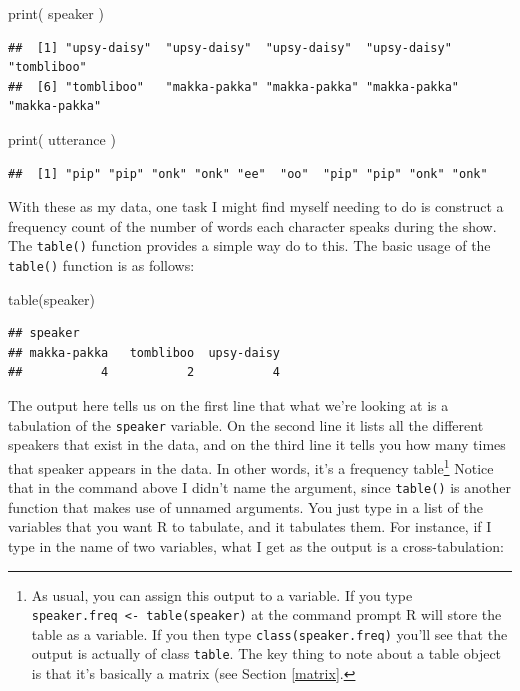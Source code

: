 \documentclass[
]{book}
\newenvironment{Shaded}{\begin{snugshade}}{\end{snugshade}}
\newcommand{\FunctionTok}[1]{\textcolor[rgb]{0.00,0.00,0.00}{#1}}
\newcommand{\NormalTok}[1]{#1}
\begin{document}
\begin{Shaded}
\begin{Highlighting}[]
\FunctionTok{print}\NormalTok{( speaker )}
\end{Highlighting}
\end{Shaded}

\begin{verbatim}
##  [1] "upsy-daisy"  "upsy-daisy"  "upsy-daisy"  "upsy-daisy"  "tombliboo"  
##  [6] "tombliboo"   "makka-pakka" "makka-pakka" "makka-pakka" "makka-pakka"
\end{verbatim}

\begin{Shaded}
\begin{Highlighting}[]
\FunctionTok{print}\NormalTok{( utterance )}
\end{Highlighting}
\end{Shaded}

\begin{verbatim}
##  [1] "pip" "pip" "onk" "onk" "ee"  "oo"  "pip" "pip" "onk" "onk"
\end{verbatim}

With these as my data, one task I might find myself needing to do is construct a frequency count of the number of words each character speaks during the show. The \texttt{table()} function provides a simple way do to this. The basic usage of the \texttt{table()} function is as follows:

\begin{Shaded}
\begin{Highlighting}[]
\FunctionTok{table}\NormalTok{(speaker)}
\end{Highlighting}
\end{Shaded}

\begin{verbatim}
## speaker
## makka-pakka   tombliboo  upsy-daisy 
##           4           2           4
\end{verbatim}

The output here tells us on the first line that what we're looking at is a tabulation of the \texttt{speaker} variable. On the second line it lists all the different speakers that exist in the data, and on the third line it tells you how many times that speaker appears in the data. In other words, it's a frequency table\footnote{As usual, you can assign this output to a variable. If you type \texttt{speaker.freq\ \textless{}-\ table(speaker)} at the command prompt R will store the table as a variable. If you then type \texttt{class(speaker.freq)} you'll see that the output is actually of class \texttt{table}. The key thing to note about a table object is that it's basically a matrix (see Section \ref{matrix}.} Notice that in the command above I didn't name the argument, since \texttt{table()} is another function that makes use of unnamed arguments. You just type in a list of the variables that you want R to tabulate, and it tabulates them. For instance, if I type in the name of two variables, what I get as the output is a cross-tabulation:
\end{document}
